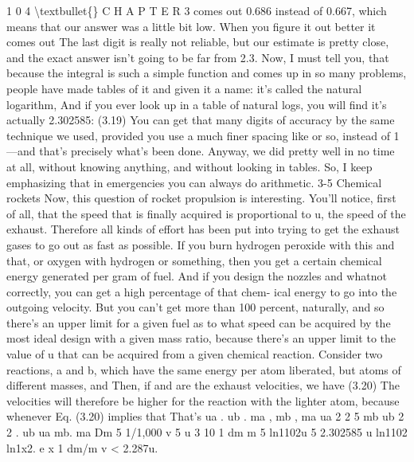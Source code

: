 \documentclass[10pt,oneside]{article}
\begin{document}
1 0 4 \textbackslash{}textbullet\{\} C H A P T E R  3 comes out 0.686 instead of 0.667, which means that our answer was a little bit low. When you figure it out better it comes out The last digit is really not reliable, but our estimate is pretty close, and the exact answer isn’t going to be far from 2.3. Now, I must tell you, that because the integral is such a simple function and comes up in so many problems, people have made tables of it and given it a name: it’s called the natural logarithm, And if you ever look up in a table of natural logs, you will find it’s actually 2.302585: (3.19) You can get that many digits of accuracy by the same technique we used, provided you use a much finer spacing like or so, instead of 1---and that’s precisely what’s been done. Anyway, we did pretty well in no time at all, without knowing anything, and without looking in tables. So, I keep emphasizing that in emergencies you can always do arithmetic. 3-5 Chemical rockets Now, this question of rocket propulsion is interesting. You’ll notice, first of all, that the speed that is finally acquired is proportional to u, the speed of the exhaust. Therefore all kinds of effort has been put into trying to get the exhaust gases to go out as fast as possible. If you burn hydrogen peroxide with this and that, or oxygen with hydrogen or something, then you get a certain chemical energy generated per gram of fuel. And if you design the nozzles and whatnot correctly, you can get a high percentage of that chem- ical energy to go into the outgoing velocity. But you can’t get more than 100 percent, naturally, and so there’s an upper limit for a given fuel as to what speed can be acquired by the most ideal design with a given mass ratio, because there’s an upper limit to the value of u that can be acquired from a given chemical reaction. Consider two reactions, a and b, which have the same energy per atom liberated, but atoms of different masses, and Then, if and are the exhaust velocities, we have (3.20) The velocities will therefore be higher for the reaction with the lighter atom, because whenever Eq. (3.20) implies that That’s ua . ub . ma , mb , ma ua 2 2 5 mb ub 2 2 . ub ua mb. ma Dm 5 1/1,000 v 5 u 3 10 1 dm m 5 ln1102u 5 2.302585 u ln1102 ln1x2. e x 1 dm/m v < 2.287u.\par
\end{document}
